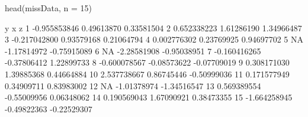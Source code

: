 \begin{Schunk}
\begin{Sinput}
 head(missData, n = 15)
\end{Sinput}
\begin{Soutput}
              y           x           z
1  -0.955853846  0.49613870  0.33581504
2   0.652338223  1.61286190  1.34966487
3  -0.217042800  0.93579168  0.21064794
4   0.002776302  0.23769925  0.94697702
5            NA -1.17814972 -0.75915089
6            NA -2.28581908 -0.95038951
7  -0.160416265 -0.37806412  1.22899733
8  -0.600078567 -0.08573622 -0.07709019
9   0.308171030  1.39885368  0.44664884
10  2.537738667  0.86745446 -0.50999036
11  0.171577949  0.34909711  0.83983002
12           NA -1.01378974 -1.34516547
13  0.569389554 -0.55009956  0.06348062
14  0.190569043  1.67090921  0.38473355
15 -1.664258945 -0.49822363 -0.22529307
\end{Soutput}
\end{Schunk}
